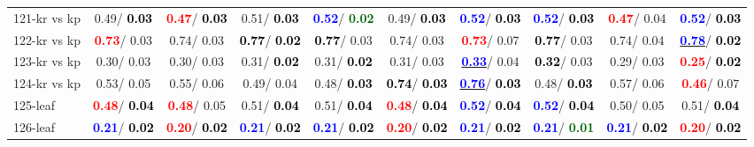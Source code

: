 \begin{table}[h]
\begin{center}
{\begin{tabular}{lc|c|c|c|c|c|c|c|c}
121-kr vs kp &   0.49/\textcolor{black}{\textbf{  0.03}} & \textcolor{red}{\textbf{  0.47}}/\textcolor{black}{\textbf{  0.03}} &   0.51/\textcolor{black}{\textbf{  0.03}} & \textcolor{blue}{\textbf{  0.52}}/\textcolor{darkgreen}{\textbf{  0.02}} &   0.49/\textcolor{black}{\textbf{  0.03}} & \textcolor{blue}{\textbf{  0.52}}/\textcolor{black}{\textbf{  0.03}} & \textcolor{blue}{\textbf{  0.52}}/\textcolor{black}{\textbf{  0.03}} & \textcolor{red}{\textbf{  0.47}}/  0.04 & \textcolor{blue}{\textbf{  0.52}}/\textcolor{black}{\textbf{  0.03}} \\
122-kr vs kp & \textcolor{red}{\textbf{  0.73}}/  0.03 &   0.74/  0.03 & \textcolor{black}{\textbf{  0.77}}/\textcolor{black}{\textbf{  0.02}} & \textcolor{black}{\textbf{  0.77}}/  0.03 &   0.74/  0.03 & \textcolor{red}{\textbf{  0.73}}/  0.07 & \textcolor{black}{\textbf{  0.77}}/  0.03 &   0.74/  0.04 & \underline{\textcolor{blue}{\textbf{  0.78}}}/\textcolor{black}{\textbf{  0.02}} \\
123-kr vs kp &   0.30/  0.03 &   0.30/  0.03 &   0.31/\textcolor{black}{\textbf{  0.02}} &   0.31/\textcolor{black}{\textbf{  0.02}} &   0.31/  0.03 & \underline{\textcolor{blue}{\textbf{  0.33}}}/  0.04 & \textcolor{black}{\textbf{  0.32}}/  0.03 &   0.29/  0.03 & \textcolor{red}{\textbf{  0.25}}/\textcolor{black}{\textbf{  0.02}} \\
124-kr vs kp &   0.53/  0.05 &   0.55/  0.06 &   0.49/  0.04 &   0.48/\textcolor{black}{\textbf{  0.03}} & \textcolor{black}{\textbf{  0.74}}/\textcolor{black}{\textbf{  0.03}} & \underline{\textcolor{blue}{\textbf{  0.76}}}/\textcolor{black}{\textbf{  0.03}} &   0.48/\textcolor{black}{\textbf{  0.03}} &   0.57/  0.06 & \textcolor{red}{\textbf{  0.46}}/  0.07 \\ \hline
125-leaf & \textcolor{red}{\textbf{  0.48}}/\textcolor{black}{\textbf{  0.04}} & \textcolor{red}{\textbf{  0.48}}/  0.05 &   0.51/\textcolor{black}{\textbf{  0.04}} &   0.51/\textcolor{black}{\textbf{  0.04}} & \textcolor{red}{\textbf{  0.48}}/\textcolor{black}{\textbf{  0.04}} & \textcolor{blue}{\textbf{  0.52}}/\textcolor{black}{\textbf{  0.04}} & \textcolor{blue}{\textbf{  0.52}}/\textcolor{black}{\textbf{  0.04}} &   0.50/  0.05 &   0.51/\textcolor{black}{\textbf{  0.04}} \\
126-leaf & \textcolor{blue}{\textbf{  0.21}}/\textcolor{black}{\textbf{  0.02}} & \textcolor{red}{\textbf{  0.20}}/\textcolor{black}{\textbf{  0.02}} & \textcolor{blue}{\textbf{  0.21}}/\textcolor{black}{\textbf{  0.02}} & \textcolor{blue}{\textbf{  0.21}}/\textcolor{black}{\textbf{  0.02}} & \textcolor{red}{\textbf{  0.20}}/\textcolor{black}{\textbf{  0.02}} & \textcolor{blue}{\textbf{  0.21}}/\textcolor{black}{\textbf{  0.02}} & \textcolor{blue}{\textbf{  0.21}}/\textcolor{darkgreen}{\textbf{  0.01}} & \textcolor{blue}{\textbf{  0.21}}/\textcolor{black}{\textbf{  0.02}} & \textcolor{red}{\textbf{  0.20}}/\textcolor{black}{\textbf{  0.02}} \\

\end{tabular}}
\end{center}
\end{table}
